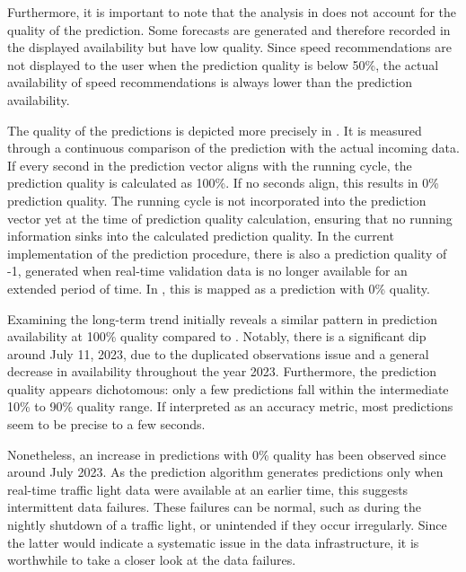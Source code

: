 Furthermore, it is important to note that the analysis in  does not account for the quality of the prediction. Some forecasts are generated and therefore recorded in the displayed availability but have low quality. Since speed recommendations are not displayed to the user when the prediction quality is below 50\%, the actual availability of speed recommendations is always lower than the prediction availability.

The quality of the predictions is depicted more precisely in . It is measured through a continuous comparison of the prediction with the actual incoming data. If every second in the prediction vector aligns with the running cycle, the prediction quality is calculated as 100\%. If no seconds align, this results in 0\% prediction quality. The running cycle is not incorporated into the prediction vector yet at the time of prediction quality calculation, ensuring that no running information sinks into the calculated prediction quality. In the current implementation of the prediction procedure, there is also a prediction quality of -1, generated when real-time validation data is no longer available for an extended period of time. In , this is mapped as a prediction with 0\% quality.

Examining the long-term trend initially reveals a similar pattern in prediction availability at 100\% quality compared to . Notably, there is a significant dip around July 11, 2023, due to the duplicated observations issue and a general decrease in availability throughout the year 2023. Furthermore, the prediction quality appears dichotomous: only a few predictions fall within the intermediate 10\% to 90\% quality range. If interpreted as an accuracy metric, most predictions seem to be precise to a few seconds. 

Nonetheless, an increase in predictions with 0\% quality has been observed since around July 2023. As the prediction algorithm generates predictions only when real-time traffic light data were available at an earlier time, this suggests intermittent data failures. These failures can be normal, such as during the nightly shutdown of a traffic light, or unintended if they occur irregularly. Since the latter would indicate a systematic issue in the data infrastructure, it is worthwhile to take a closer look at the data failures.

